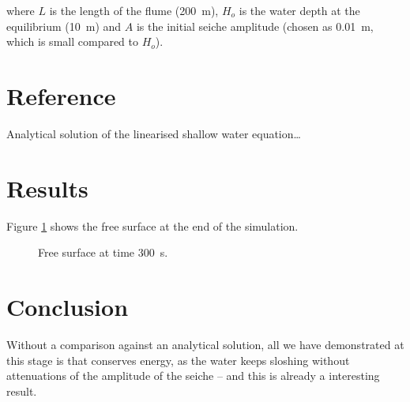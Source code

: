 where $L$ is the length of the flume (200~m), $H_o$ is the water depth at the
equilibrium (10~m) and $A$ is the initial seiche amplitude (chosen as 0.01~m,
which is small compared to $H_o$).

\section{Reference}
Analytical solution of the linearised shallow water equation\ldots

\section{Results}
Figure \ref{fig:seiche:result} shows the free surface at the end of the
simulation.

\begin{figure}[H]
\centering
{}
\caption{Free surface at time 300~s.}
\label{fig:seiche:result}
\end{figure}

\section{Conclusion}
Without a comparison against an analytical solution, all we have demonstrated at
this stage is that  conserves energy, as the water keeps sloshing
without attenuations of the amplitude of the seiche – and this is already a
interesting result.
